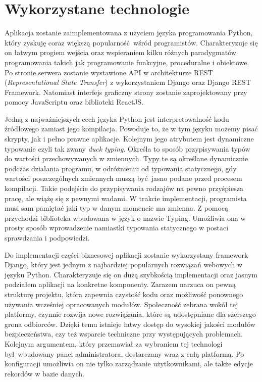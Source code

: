 \section{Wykorzystane technologie}
Aplikacja zostanie zaimplementowana z użyciem języka programowania Python, który zyskuję coraz większą popularność wśród programistów. Charakteryzuje się on łatwym progiem wejścia oraz wspieraniem kilku różnych paradygmatów programowania takich jak programowanie funkcyjne, proceduralne i obiektowe.\cite{book_3} Po stronie serwera zostanie wystawione API w architekturze REST (\textit{Representational State Transfer}) z wykorzystaniem Django oraz Django REST Framework. Natomiast interfejs graficzny strony zostanie zaprojektowany przy pomocy JavaScriptu oraz biblioteki ReactJS.

Jedną z najważniejszych cech języka Python jest interpretowalność kodu źródłowego zamiast jego kompilacja.\cite{misc_python} Powoduje to, że w tym języku możemy pisać skrypty, jak i pełno prawne aplikacje. Kolejnym jego atrybutem jest dynamiczne typowanie czyli tak zwany \textit{duck typing}. Określa to sposób przypisywania typów do wartości przechowywanych w zmiennych. Typy te są określane dynamicznie podczas działania programu, w odróżnieniu od typowania statycznego, gdy wartości poszczególnych zmiennych muszą być jasno podane przed procesem kompilacji. Takie podejście do przypisywania rodzajów na pewno przyśpiesza pracę, ale wiążę się z pewnymi wadami. W trakcie implementacji, programista musi sam pamiętać jaki typ w danym momencie ma zmienna. Z pomocą przychodzi biblioteka wbudowana w język o nazwie Typing. Umożliwia ona w prosty sposób wprowadzenie namiastki typowania statycznego w postaci sprawdzania i podpowiedzi.

Do implementacji części biznesowej aplikacji zostanie wykorzystany framework Django, który jest jednym z najbardziej popularnych rozwiązań webowych w języku Python. Charakteryzuje się on dużą szybkością implementacji oraz jasnym podziałem aplikacji na konkretne komponenty. Zarazem narzuca on pewną strukturę projektu, która zapewnia czystość kodu oraz możliwość ponownego używania wcześniej opracowanych modułów.\cite{misc_django} Społeczność zebrana wokół tej platformy, czynnie rozwija nowe rozwiązania, które są udostępniane dla szerszego grona odbiorców. Dzięki temu istnieje łatwy dostęp do wysokiej jakości modułów bezpieczeństwa, czy też wsparcie techniczne przy występujących problemach. Kolejnym argumentem, który przemawiał za wybraniem tej technologi był wbudowany panel administratora, dostarczany wraz z całą platformą. Po konfiguracji umożliwia on nie tylko zarządzanie użytkownikami, ale także edycje rekordów w bazie danych. 


